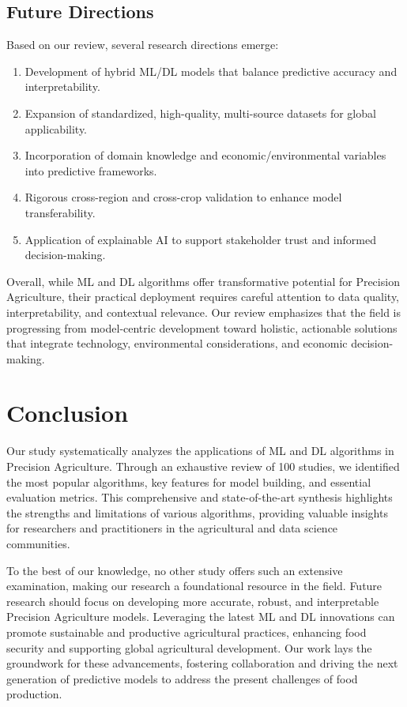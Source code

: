 \documentclass[conference]{IEEEtran}
\begin{document}
\subsection{Future Directions}

Based on our review, several research directions emerge:

\begin{enumerate}
    \item Development of hybrid ML/DL models that balance predictive accuracy and interpretability.
    \item Expansion of standardized, high-quality, multi-source datasets for global applicability.
    \item Incorporation of domain knowledge and economic/environmental variables into predictive frameworks.
    \item Rigorous cross-region and cross-crop validation to enhance model transferability.
    \item Application of explainable AI to support stakeholder trust and informed decision-making.
\end{enumerate}

Overall, while ML and DL algorithms offer transformative potential for Precision Agriculture, their practical deployment requires careful attention to data quality, interpretability, and contextual relevance. Our review emphasizes that the field is progressing from model-centric development toward holistic, actionable solutions that integrate technology, environmental considerations, and economic decision-making.

\section*{Conclusion}
Our study systematically analyzes the applications of ML and DL algorithms in Precision Agriculture. Through an exhaustive review of 100 studies, we identified the most popular algorithms, key features for model building, and essential evaluation metrics. This comprehensive and state-of-the-art synthesis highlights the strengths and limitations of various algorithms, providing valuable insights for researchers and practitioners in the agricultural and data science communities.

To the best of our knowledge, no other study offers such an extensive examination, making our research a foundational resource in the field. Future research should focus on developing more accurate, robust, and interpretable Precision Agriculture models. Leveraging the latest ML and DL innovations can promote sustainable and productive agricultural practices, enhancing food security and supporting global agricultural development. Our work lays the groundwork for these advancements, fostering collaboration and driving the next generation of predictive models to address the present challenges of food production.
\end{document}
